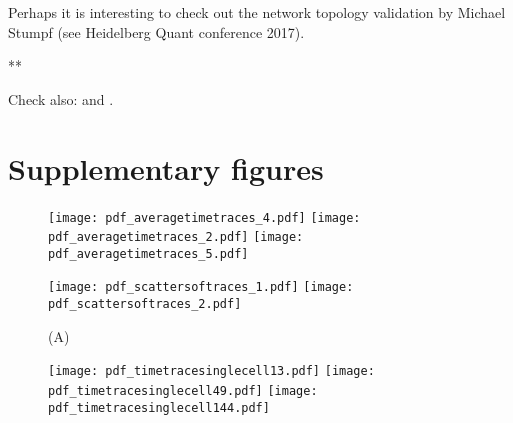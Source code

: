Perhaps it is interesting to check out the network topology validation by Michael Stumpf (see Heidelberg Quant conference 2017). 

**


Check also:
\cite{VanHeerden2017}
and
\cite{Nordholt2017}.


\section*{Supplementary figures}


\begin{figure}%
	\centering
	\texttt{[image: pdf\_averagetimetraces\_4.pdf]}
	\texttt{[image: pdf\_averagetimetraces\_2.pdf]}
	\texttt{[image: pdf\_averagetimetraces\_5.pdf]}
	\clearpage %
	\label{fig:XXX:XXX}
\end{figure}	

\clearpage



\begin{figure}%
	\centering
	\texttt{[image: pdf\_scattersoftraces\_1.pdf]}
	\texttt{[image: pdf\_scattersoftraces\_2.pdf]}	
	\caption{ 
		(A) 
	}
	\label{fig:CRP:XXX}
\end{figure}%

\begin{figure}%
	\centering
	\texttt{[image: pdf\_timetracesinglecell13.pdf]}
	\texttt{[image: pdf\_timetracesinglecell49.pdf]}
	\texttt{[image: pdf\_timetracesinglecell144.pdf]}
	\clearpage %
	\label{fig:XXX:XXX}
\end{figure}	

